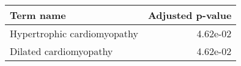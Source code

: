 \begin{tabular}{lr}
\toprule
                  Term name &  Adjusted p-value \\
\midrule
Hypertrophic cardiomyopathy &          4.62e-02 \\
     Dilated cardiomyopathy &          4.62e-02 \\
\bottomrule
\end{tabular}

